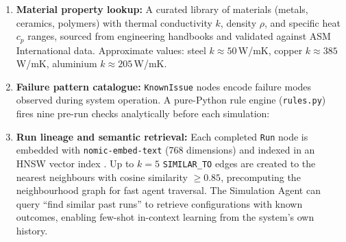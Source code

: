 \documentclass[preprint,review,12pt]{elsarticle}
\begin{document}
\begin{enumerate}
  \item \textbf{Material property lookup:}  A curated library of materials
        (metals, ceramics, polymers) with thermal conductivity $k$,
        density $\rho$, and specific heat $c_p$ ranges, sourced from
        engineering handbooks and validated against ASM International data.
        Approximate values: steel $k \approx 50$\,W/mK, copper
        $k \approx 385$\,W/mK, aluminium $k \approx 205$\,W/mK.

  \item \textbf{Failure pattern catalogue:}  \texttt{KnownIssue} nodes
        encode failure modes observed during system operation.
        A pure-Python rule engine (\texttt{rules.py}) fires nine
        pre-run checks analytically before each simulation:

        \smallskip\par

  \item \textbf{Run lineage and semantic retrieval:}  Each completed
        \texttt{Run} node is embedded with \texttt{nomic-embed-text}
        \citep{nussbaum2024nomic} (768 dimensions) and indexed in an
        HNSW vector index \citep{malkov2020hnsw}.  Up to
        $k{=}5$ \texttt{SIMILAR\_TO} edges are created to the nearest
        neighbours with cosine similarity $\ge 0.85$, precomputing the
        neighbourhood graph for fast agent traversal.  The Simulation
        Agent can query ``find similar past runs'' to retrieve configurations
        with known outcomes, enabling few-shot in-context learning from
        the system's own history.
\end{enumerate}
\end{document}
